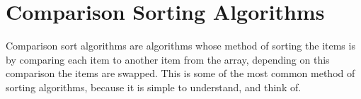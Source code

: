 \documentclass{subfile}
\begin{document}
\section{Comparison Sorting Algorithms}
Comparison sort algorithms are algorithms whose method of sorting the items is by comparing each item to another item from the array, depending on this comparison the items are swapped. This is some of the most common method of sorting algorithms, because it is simple to understand, and think of.  
\newpage



\end{document}
